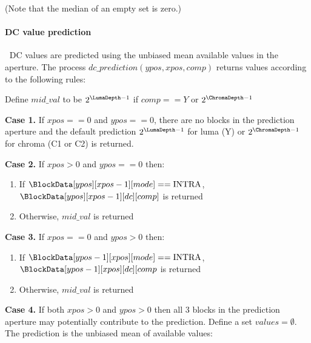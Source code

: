 (Note that the median of an empty set is zero.)

\paragraph{DC value prediction}
\label{dcprediction}
$\ $\newline
DC values are predicted using the unbiased mean available values in the aperture. The
process $dc\_prediction(ypos, xpos, comp)$ returns values according to
the following rules:

Define $mid\_val$ to be $2^{\LumaDepth-1}$ if $comp==Y$ or 
$2^{\ChromaDepth-1}$

{\bf Case 1.}  If $xpos==0$ and $ypos==0$, there are no blocks in the prediction aperture and
the default prediction $2^{\LumaDepth-1}$ for luma (Y) or 
$2^{\ChromaDepth-1}$ for chroma (C1 or C2) is returned.

{\bf Case 2.} If $xpos>0$ and $ypos==0$ then:
\begin{enumerate}
   \item If $\BlockData[ypos][xpos-1][mode]==\Intra$, $\BlockData[ypos][xpos-1][dc][comp]$ is returned
   \item Otherwise, $mid\_val$ is returned
\end{enumerate}

{\bf Case 3.} If $xpos==0$ and $ypos>0$ then:
\begin{enumerate}
   \item If $\BlockData[ypos-1][xpos][mode]==\Intra$, $\BlockData[ypos-1][xpos][dc][comp$ is returned
   \item Otherwise, $mid\_val$ is returned
\end{enumerate}

{\bf Case 4.} If both $xpos>0$ and $ypos>0$ then all 3 blocks in the prediction aperture may potentially
contribute to the prediction. Define a set $values=\emptyset$. The prediction is the 
unbiased mean of available values:

\begin{pseudo*}
    \bsIF{\BlockData[ypos][xpos-1][mode]==\Intra}
    \bsEND
    \bsIF{\BlockData[ypos-1][xpos][mode]==\Intra}
    \bsEND
    \bsIF{\BlockData[ypos-1][xpos-1][mode]==\Intra}
    \bsEND

    \bsELSE
    \bsEND
\bsEND
\end{pseudo*}


